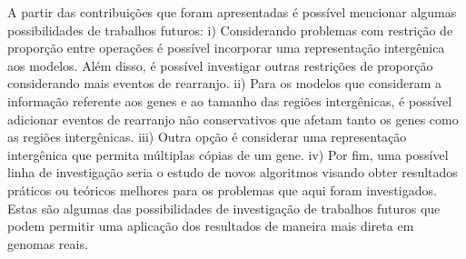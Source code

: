 A partir das contribuições que foram apresentadas é possível mencionar algumas possibilidades de trabalhos futuros: i) Considerando problemas com restrição de proporção entre operações é possível incorporar uma representação intergênica aos modelos. Além disso, é possível investigar outras restrições de proporção considerando mais eventos de rearranjo. ii) Para os modelos que consideram a informação referente aos genes e ao tamanho das regiões intergênicas, é possível adicionar eventos de rearranjo não conservativos que afetam tanto os genes como as regiões intergênicas. iii) Outra opção é considerar uma representação intergênica que permita múltiplas cópias de um gene. iv) Por fim, uma possível linha de investigação seria o estudo de novos algoritmos visando obter resultados práticos ou teóricos melhores para os problemas que aqui foram investigados.  Estas são algumas das possibilidades de investigação de trabalhos futuros que podem permitir uma aplicação dos resultados de maneira mais direta em genomas reais. 